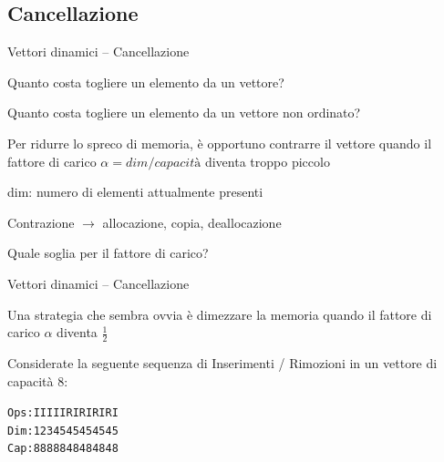 \subsection{Cancellazione}

\begin{frame}{Vettori dinamici -- Cancellazione}

\begin{myboxtitle}[Domande]
\BI
\item Quanto costa togliere un elemento da un vettore?
\item Quanto costa togliere un elemento da un vettore \alert{non ordinato}?
\EI
\end{myboxtitle}

\begin{myboxtitle}[Contrazione]
Per ridurre lo spreco di memoria, è opportuno contrarre il vettore quando il \alert{fattore di carico $\alpha = \textit{dim} / \textit{capacità}$} diventa troppo piccolo

\BI
\item \alert{dim}: numero di elementi attualmente presenti
\item Contrazione $\rightarrow$ allocazione, copia, deallocazione
\EI
\end{myboxtitle}

\begin{myboxtitle}[Domanda]
Quale soglia per il fattore di carico?
\end{myboxtitle}

\end{frame}

\begin{frame}[fragile]{Vettori dinamici -- Cancellazione}
	
\begin{myboxtitle}
Una strategia che sembra ovvia è dimezzare la memoria quando il fattore di carico $\alpha$ diventa $\frac{1}{2}$
\end{myboxtitle}


\pause
\bigskip
Considerate la seguente sequenza di \alert{I}nserimenti / \alert{R}imozioni in un vettore di capacità $8$:
\begin{alltt}
Ops: I I I I I R I R I R I R I
Dim: 1 2 3 4 5 4 5 4 5 4 5 4 5
Cap: 8 8 8 8 8 4 8 4 8 4 8 4 8
\end{alltt}

\end{frame}

